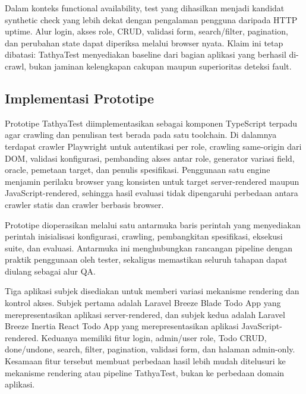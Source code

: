 \documentclass[conference]{IEEEtran}
\begin{document}
Dalam konteks functional availability, test yang dihasilkan menjadi kandidat synthetic check yang lebih dekat dengan pengalaman pengguna daripada HTTP uptime. Alur login, akses role, CRUD, validasi form, search/filter, pagination, dan perubahan state dapat diperiksa melalui browser nyata. Klaim ini tetap dibatasi: TathyaTest menyediakan baseline dari bagian aplikasi yang berhasil di-crawl, bukan jaminan kelengkapan cakupan maupun superioritas deteksi fault.

\subsection{Implementasi Prototipe}

Prototipe TathyaTest diimplementasikan sebagai komponen TypeScript terpadu agar crawling dan penulisan test berada pada satu toolchain. Di dalamnya terdapat crawler Playwright untuk autentikasi per role, crawling same-origin dari DOM, validasi konfigurasi, pembanding akses antar role, generator variasi field, oracle, pemetaan target, dan penulis spesifikasi. Penggunaan satu engine menjamin perilaku browser yang konsisten untuk target server-rendered maupun JavaScript-rendered, sehingga hasil evaluasi tidak dipengaruhi perbedaan antara crawler statis dan crawler berbasis browser.

Prototipe dioperasikan melalui satu antarmuka baris perintah yang menyediakan perintah inisialisasi konfigurasi, crawling, pembangkitan spesifikasi, eksekusi suite, dan evaluasi. Antarmuka ini menghubungkan rancangan pipeline dengan praktik penggunaan oleh tester, sekaligus memastikan seluruh tahapan dapat diulang sebagai alur QA.

Tiga aplikasi subjek disediakan untuk memberi variasi mekanisme rendering dan kontrol akses. Subjek pertama adalah Laravel Breeze Blade Todo App yang merepresentasikan aplikasi server-rendered, dan subjek kedua adalah Laravel Breeze Inertia React Todo App yang merepresentasikan aplikasi JavaScript-rendered. Keduanya memiliki fitur login, admin/user role, Todo CRUD, done/undone, search, filter, pagination, validasi form, dan halaman admin-only. Kesamaan fitur tersebut membuat perbedaan hasil lebih mudah ditelusuri ke mekanisme rendering atau pipeline TathyaTest, bukan ke perbedaan domain aplikasi.
\end{document}
